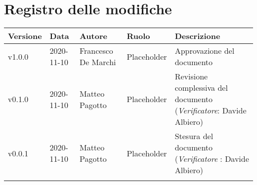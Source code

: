 \section*{\hfil Registro delle modifiche \hfil}
{
	\newlength{\freewidth}
	\setlength{\freewidth}{\dimexpr\textwidth-10\tabcolsep}
	\renewcommand{\arraystretch}{1.5}
	\centering
	\setlength{\aboverulesep}{0pt}
	\setlength{\belowrulesep}{0pt}
	\begin{longtable}{C{.131777\freewidth} C{.134036\freewidth} C{.263554\freewidth} C{.188254\freewidth} C{.282379\freewidth}}
		\toprule 
		\textbf{Versione} & \textbf{Data} & \textbf{Autore} & \textbf{Ruolo} & \textbf{Descrizione}\\
		\toprule
		\endhead
		
		v1.0.0 & 2020-11-10 &Francesco De Marchi & Placeholder & Approvazione del documento \\  
		v0.1.0 & 2020-11-10 & Matteo Pagotto & Placeholder & Revisione complessiva del documento (\textit{Verificatore}: Davide Albiero) \\ 
		v0.0.1 & 2020-11-10 & Matteo Pagotto & Placeholder & Stesura del documento (\textit{Verificatore} : Davide Albiero) \\
		
		
		\bottomrule
		\hiderowcolors
	\end{longtable}
}
